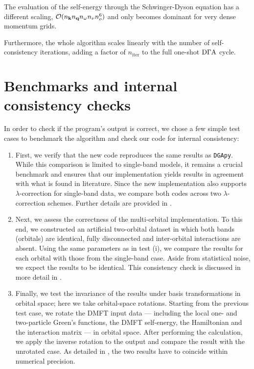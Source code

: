 \documentclass[../../main.tex]{subfiles}
\begin{document}
The evaluation of the self-energy through the Schwinger-Dyson equation has a different scaling, $\mathcal{O}(n_{\textbf{k}}n_{\textbf{q}}n_{\omega}n_{\nu}n_{o}^6)$ and only becomes dominant for very dense momentum grids.

Furthermore, the whole algorithm scales linearly with the number of self-consistency iterations, adding a factor of $n_{\mathrm{iter}}$ to the full one-shot $\text{D}\Gamma\text{A}$ cycle.

\section{Benchmarks and internal consistency checks}

In order to check if the program's output is correct, we chose a few simple test cases to benchmark the algorithm and check our code for internal consistency:
\begin{enumerate}[label=(\roman*)]
\item First, we verify that the new code reproduces the same results as \texttt{DGApy}. While this comparison is limited to single-band models, it remains a crucial benchmark and ensures that our implementation yields results in agreement with what is found in literature. Since the new implementation also supports $\lambda$-correction for single-band data, we compare both codes across two $\lambda$-correction schemes. Further details are provided in .
\item Next, we assess the correctness of the multi-orbital implementation. To this end, we constructed an artificial two-orbital dataset in which both bands (orbitals) are identical, fully disconnected and inter-orbital interactions are absent. Using the same parameters as in test (i), we compare the results for each orbital with those from the single-band case. Aside from statistical noise, we expect the results to be identical. This consistency check is discussed in more detail in .
\item Finally, we test the invariance of the results under basis transformations in orbital space; here we take orbital-space rotations. Starting from the previous test case, we rotate the DMFT input data --- including the local one- and two-particle Green's functions, the DMFT self-energy, the Hamiltonian and the interaction matrix --- in orbital space. After performing the calculation, we apply the inverse rotation to the output and compare the result with the unrotated case. As detailed in , the two results have to coincide within numerical precision.
\end{enumerate}
\end{document}
